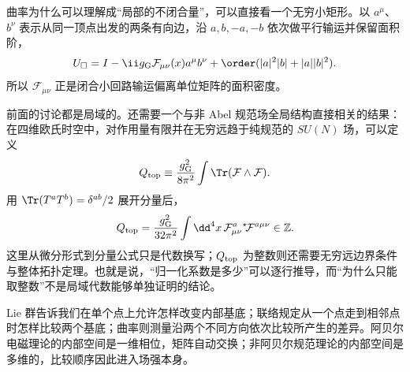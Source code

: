 曲率为什么可以理解成“局部的不闭合量”，可以直接看一个无穷小矩形。以 $a^\mu$、$b^\nu$ 表示从同一顶点出发的两条有向边，沿 $a,b,-a,-b$ 依次做平行输运并保留面积阶，
\begin{equation}
 {
 U_\square
 =I-\ii g_{\rm G}\mathcal F_{\mu\nu}(x)
 a^\mu b^\nu
 +\order(|a|^2|b|+|a||b|^2).}
 \label{eq:small-loop-curvature-dp11}
\end{equation}
所以 $\mathcal F_{\mu\nu}$ 正是闭合小回路输运偏离单位矩阵的面积密度。

前面的讨论都是局域的。还需要一个与非 Abel 规范场全局结构直接相关的结果：在四维欧氏时空中，对作用量有限并在无穷远趋于纯规范的 $SU(N)$ 场，可以定义
\begin{equation}
 Q_{\rm top}
 \equiv\frac{g_{\rm G}^2}{8\pi^2}\int\Tr(\mathcal F\wedge\mathcal F).
 \label{eq:pontryagin-form-definition-dp68}
\end{equation}
用 $\Tr(T^aT^b)=\delta^{ab}/2$ 展开分量后，
\begin{equation}
 {
 Q_{\rm top}
 =\frac{g_{\rm G}^2}{32\pi^2}\int\dd^4 x\,
 \mathcal F_{\mu\nu}^a{}^\star\!\mathcal F^{a\mu\nu}
 \in\mathbb Z.}
 \label{eq:pontryagin-number-dp11}
\end{equation}
这里从微分形式到分量公式只是代数换写；$Q_{\rm top}$ 为整数则还需要无穷远边界条件与整体拓扑定理。也就是说，“归一化系数是多少”可以逐行推导，而“为什么只能取整数”不是局域代数能够单独证明的结论。

Lie 群告诉我们在单个点上允许怎样改变内部基底；联络规定从一个点走到相邻点时怎样比较两个基底；曲率则测量沿两个不同方向依次比较所产生的差异。阿贝尔电磁理论的内部空间是一维相位，矩阵自动交换；非阿贝尔规范理论的内部空间是多维的，比较顺序因此进入场强本身。

